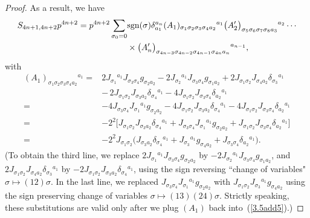 \documentclass[10pt,a4paper]{amsart}
\numberwithin{equation}{section}
\theoremstyle{definition}
\newcommand{\sgn}{{\rm sgn}}
\begin{document}
\begin{proof}
As a result, we have
\begin{align}
S_{4n+1,4n+2}p^{4n+2}
 = p^{4n+2} \sum_{\sigma_0 = 0}& \sgn(\sigma) \delta_{a_1}^{a_n}
 ({A_1})_{\sigma_1 \sigma_2 \sigma_3 \sigma_4 a_2}{}^{a_1}
 \bigl({A_2^\prime}\bigr)_{\sigma_5 \sigma_6 \sigma_7 \sigma_8 a_3}{}^{a_2}\cdots\nonumber \\
&\times
\bigl({A_n^\prime}\bigr)_{\sigma_{4n-3} \sigma_{4n-2} \sigma_{4n-1} \sigma_{4n} a_n}{}^{a_{n-1}},\label{3.5add5}
\end{align}
with
\begin{align*}
({A_1})_{\sigma_1 \sigma_2 \sigma_3 \sigma_4 a_2}{}^{a_1}
={}&2J_{\sigma_1}{}^{a_1} J_{\sigma_3 \sigma_4} g_{\sigma_2 a_2}
-2 J_{\sigma_2}{}^{a_1} J_{\sigma_3 \sigma_4} g_{\sigma_1 a_2}
+2J_{\sigma_1 \sigma_2} J_{\sigma_4 a_2} \delta_{\sigma_3}{}^{a_1}
\\ \nonumber
&
{-}\,2J_{\sigma_1 \sigma_2} J_{\sigma_3 a_2} \delta_{\sigma_4}{}^{a_1}
-4J_{\sigma_1 \sigma_2} J_{\sigma_3 \sigma_4} \delta_{a_2}{}^{a_1}
\\ \nonumber
={}&{-}4 J_{\sigma_3 \sigma_4} J_{\sigma_1}{}^{a_1} g_{\sigma_2 a_2}
 -4 J_{\sigma_1 \sigma_2} J_{\sigma_3 a_2} \delta_{\sigma_4}{}^{a_1}
 -4J_{\sigma_1 \sigma_2} J_{\sigma_3 \sigma_4} \delta_{a_2}{}^{a_1}
\\ \nonumber
={}& {-}2^2 \bigl[J_{\sigma_1 \sigma_2} J_{\sigma_3 a_2} \delta_{\sigma_4}{}^{a_1}
 + J_{\sigma_3 \sigma_4} J_{\sigma_1}{}^{a_1} g_{\sigma_2 a_2}
 + J_{\sigma_1 \sigma_2} J_{\sigma_3 \sigma_4} \delta_{a_2}{}^{a_1}\bigr]
\\ \nonumber
={}&{-}2^2 J_{\sigma_1 \sigma_2}
 \bigl(J_{\sigma_3 a_2} \delta_{\sigma_4}{}^{a_1}
 +J_{\sigma_3}{}^{a_1} g_{\sigma_4 a_2}
 + J_{\sigma_3 \sigma_4} \delta_{a_2}{}^{a_1} \bigr).
\end{align*}
(To obtain the third line, we replace
$2J_{\sigma_1}{}^{a_1} J_{\sigma_3 \sigma_4} g_{\sigma_2 a_2} $ by
$-2 J_{\sigma_2}{}^{a_1} J_{\sigma_3 \sigma_4} g_{\sigma_1 a_2} $, and
$2J_{\sigma_1 \sigma_2} J_{\sigma_4 a_2} \delta_{\sigma_3}{}^{a_1} $
by $-2J_{\sigma_1 \sigma_2} J_{\sigma_3 a_2} \delta_{\sigma_4}{}^{a_1}$, using the sign reversing ``change of variables" $\sigma\mapsto (12)\sigma$.
In the last line, we replaced $ J_{\sigma_3 \sigma_4} J_{\sigma_1}{}^{a_1} g_{\sigma_2 a_2}$ with
$J_{\sigma_1 \sigma_2} J_{\sigma_3}{}^{a_1} g_{\sigma_4 a_2} $ using the sign preserving change of variables
$\sigma\mapsto (13)(24)\sigma$. Strictly speaking, these substitutions are valid only after we plug $(A_1)$ back into~(\ref{3.5add5}).)


\end{proof}
\end{document}
